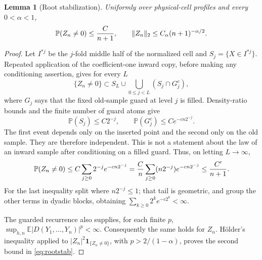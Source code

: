 \documentclass[11pt]{article}
\numberwithin{equation}{section}
\newtheorem{lemma}[theorem]{Lemma}
\theoremstyle{definition}\newtheorem{definition}[theorem]{Definition}
\theoremstyle{remark}\newtheorem{remark}[theorem]{Remark}
\newcommand{\E}{\mathbb E}\newcommand{\Pp}{\mathbb P}
\newcommand{\1}{\mathbf 1}\newcommand{\cD}{\mathcal D}
\begin{document}
\begin{lemma}[Root stabilization]\label{lem:rootstab}
Uniformly over physical-cell profiles and every $0<\alpha<1$,
\begin{equation}
 \Pp(Z_n\ne0)\le {C\over n+1},\qquad
 \|Z_n\|_2\le C_\alpha(n+1)^{-\alpha/2}.                 \label{eq:rootstab}
\end{equation}
\end{lemma}
\begin{proof}
Let $I^{*j}$ be the $j$-fold middle half of the normalized cell and
$S_j=\{X\in I^{*j}\}$.  Repeated application of the coefficient-one inward
copy, before making any conditioning assertion, gives for every $L$
\begin{equation}
 \{Z_n\ne0\}\subset S_L\cup
 \bigcup_{0\le j<L}(S_j\cap G_j^c),                      \label{eq:supportinc}
\end{equation}
where $G_j$ says that the fixed old-sample guard at level $j$ is filled.
Density-ratio bounds and the finite number of guard atoms give
\begin{equation}
 \Pp(S_j)\le C2^{-j},\qquad \Pp(G_j^c)\le Ce^{-cn2^{-j}}. \label{eq:twoprobs}
\end{equation}
The first event depends only on the inserted point and the second only on
the old sample.  They are therefore independent.  This is not a statement
about the law of an inward sample after conditioning on a filled guard.
Thus, on letting $L\to\infty$,
\begin{equation}
 \Pp(Z_n\ne0)\le C\sum_{j\ge0}2^{-j}e^{-cn2^{-j}}
 ={C\over n}\sum_{j\ge0}(n2^{-j})e^{-cn2^{-j}}\le {C'\over n+1}.
                                                               \label{eq:dyadicsum}
\end{equation}
For the last inequality split where $n2^{-j}\le1$; that tail is geometric,
and group the other terms in dyadic blocks, obtaining
$\sum_{k\ge0}2^ke^{-c2^k}<\infty$.

The guarded recurrence also supplies, for each finite $p$,
$\sup_{h,n}\E|D(Y_1,\ldots,Y_n)|^p<\infty$.  Consequently the same holds
for $Z_n$.  H\"older's inequality applied to
$|Z_n|^2\mathbf1_{\{Z_n\ne0\}}$, with $p>2/(1-\alpha)$, proves the second
bound in \eqref{eq:rootstab}.
\end{proof}
\end{document}
